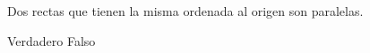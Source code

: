 Dos rectas que tienen la misma ordenada al origen son paralelas.

\begin{choices}
    \choice Verdadero
    \CorrectChoice Falso
\end{choices}